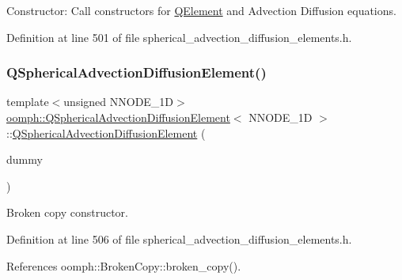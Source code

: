 Constructor\+: Call constructors for \hyperlink{classoomph_1_1QElement}{Q\+Element} and Advection Diffusion equations. 



Definition at line 501 of file spherical\+\_\+advection\+\_\+diffusion\+\_\+elements.\+h.

\mbox{\label{classoomph_1_1QSphericalAdvectionDiffusionElement_a3ab4082df2e8a5d0c6dc95432487ba71}} 
\subsubsection{\texorpdfstring{Q\+Spherical\+Advection\+Diffusion\+Element()}{QSphericalAdvectionDiffusionElement()}\hspace{0.1cm}{\footnotesize\ttfamily [2/2]}}
{\footnotesize\ttfamily template$<$unsigned N\+N\+O\+D\+E\+\_\+1D$>$ \\
\hyperlink{classoomph_1_1QSphericalAdvectionDiffusionElement}{oomph\+::\+Q\+Spherical\+Advection\+Diffusion\+Element}$<$ N\+N\+O\+D\+E\+\_\+1D $>$\+::\hyperlink{classoomph_1_1QSphericalAdvectionDiffusionElement}{Q\+Spherical\+Advection\+Diffusion\+Element} (\begin{DoxyParamCaption}\item[{const \hyperlink{classoomph_1_1QSphericalAdvectionDiffusionElement}{Q\+Spherical\+Advection\+Diffusion\+Element}$<$ N\+N\+O\+D\+E\+\_\+1D $>$ \&}]{dummy }\end{DoxyParamCaption})\hspace{0.3cm}{\ttfamily [inline]}}



Broken copy constructor. 



Definition at line 506 of file spherical\+\_\+advection\+\_\+diffusion\+\_\+elements.\+h.



References oomph\+::\+Broken\+Copy\+::broken\+\_\+copy().



